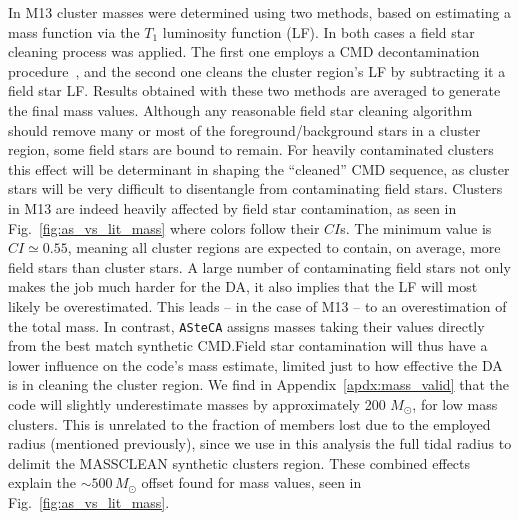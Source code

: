 \documentclass[draft]{aa}
\begin{document}
In M13 cluster masses were determined using two methods, based on estimating
a mass function via the $T_1$ luminosity function (LF).
In both cases a field star cleaning process was applied. The first one employs
a CMD decontamination procedure~\citep{Maia_2010}, and the
second one cleans the cluster region's LF by subtracting it a field star LF.\@
Results obtained with these two methods are averaged to generate the final
mass values.
%
Although any reasonable field star cleaning algorithm should remove many or most
of the foreground/background stars in a cluster region, some field stars are
bound to remain. For heavily contaminated clusters this effect will be
determinant in shaping the ``cleaned'' CMD sequence, as cluster stars will be
very difficult to disentangle from contaminating field stars.
%
Clusters in M13 are indeed heavily affected by field star contamination,
as seen in Fig.~\ref{fig:as_vs_lit_mass} where colors follow their $CI$s.
The minimum value is $CI{\simeq}0.55$, meaning all cluster regions are expected
to contain, on average, more field stars than cluster stars.
%
A large number of contaminating field stars not only makes the job much harder
for the DA, it also implies that the LF will most likely be overestimated. This
leads -- in the case of M13 --  to an overestimation of the total mass.
%
In contrast, \texttt{ASteCA} assigns masses taking their values directly from
the best match synthetic CMD.\@ Field star contamination will thus have a lower
influence on the code's mass estimate, limited just to how effective the DA is
in cleaning the cluster region.
%
We find in Appendix~\ref{apdx:mass_valid} that the code will slightly
underestimate masses by approximately 200 $M_{\odot}$, for low mass
clusters. This is unrelated to the fraction of members lost due
to the employed radius (mentioned previously), since we use in this analysis
the full tidal radius to delimit the MASSCLEAN synthetic clusters region.
These combined effects explain the ${\sim}500\,M_{\odot}$ offset found
for mass values, seen in Fig.~\ref{fig:as_vs_lit_mass}.
\end{document}
